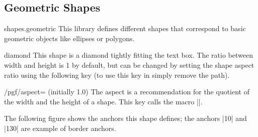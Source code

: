 \subsection{Geometric Shapes}

\begin{pgflibrary}{shapes.geometric}
  This library defines different shapes that correspond to basic
  geometric objects like ellipses or polygons.
\end{pgflibrary}


\begin{shape}{diamond}
  This shape is a diamond tightly fitting the text box. The ratio
  between width and height is 1 by default, but can be changed by
  setting the shape aspect ratio using the following \pgfname{}
  key (to use this key in \tikzname{} simply remove the 
   path). 

 	\begin{key}{/pgf/aspect= (initially 1.0)}
 		The aspect is a recommendation for the quotient of the width and 
 		the height of a shape. This key calls the macro
 		|\pgfsetshapeaspect|.
 	\end{key}
 	
 	The following figure shows the anchors this
  shape defines; the anchors |10| and |130| are example of border
  anchors.
  
\begin{codeexample}[]
\Huge
{}
\end{codeexample}
\end{shape}

